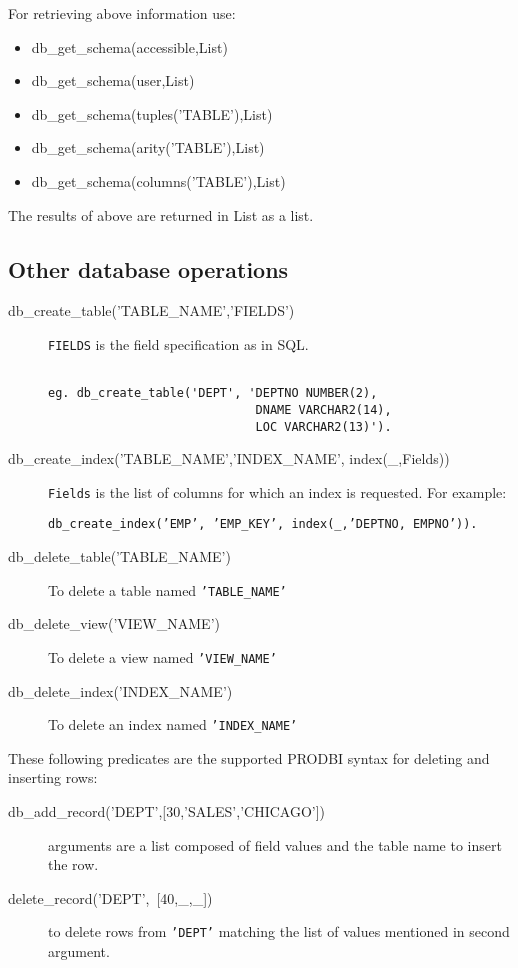 For retrieving above information use:
\begin{itemize}

\item db\_get\_schema(accessible,List)
\item db\_get\_schema(user,List)
\item db\_get\_schema(tuples('TABLE'),List)
\item db\_get\_schema(arity('TABLE'),List)
\item db\_get\_schema(columns('TABLE'),List)
\end{itemize}

The results of above are returned in List as a list.


\subsection{Other database operations}

\begin{description}

\item[db\_create\_table('TABLE\_NAME','FIELDS')]
	{\tt FIELDS} is the field specification as in SQL.
\begin{verbatim}

eg. db_create_table('DEPT', 'DEPTNO NUMBER(2),
                             DNAME VARCHAR2(14),
                             LOC VARCHAR2(13)').
\end{verbatim}


\item[db\_create\_index('TABLE\_NAME','INDEX\_NAME', index(\_,Fields))]
	{\tt Fields} is the list of columns for which an index
	is requested.  For example:
\begin{center}

{\tt db\_create\_index('EMP', 'EMP\_KEY', index(\_,'DEPTNO, EMPNO')).}
\end{center}

\item[db\_delete\_table('TABLE\_NAME')] To delete a table named {\tt 'TABLE\_NAME'}

\item[db\_delete\_view('VIEW\_NAME')] To delete a view named {\tt 'VIEW\_NAME'}

\item[db\_delete\_index('INDEX\_NAME')] To delete an index named {\tt 'INDEX\_NAME'}
\end{description}

These following predicates are the supported PRODBI syntax for deleting and inserting rows:
\begin{description}

\item[\mbox{db\_add\_record('DEPT',[30,'SALES','CHICAGO'])}]
	 arguments are a list composed of field values and the table name to
	 insert the row.

\item[\mbox{delete\_record('DEPT', [40,\_,\_])}]
	 to delete rows from {\tt 'DEPT'} matching the list of values mentioned in
	 second argument. 
\end{description}

